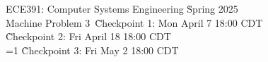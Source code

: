 \documentclass{article}
\begin{document}
\topmargin=-30pt
\headheight=12pt
\headsep=18pt
\footskip=0pt
\pagestyle{headings}
\thispagestyle{empty}

\newcommand{\showallduedates}{0}

\newlength{\sus}
\newlength{\extrasus}

{\large \bf
    \begin{tabbing}
    ECE391: Computer Systems Engineering \` Spring 2025\\
    Machine Problem 3\
    \` Checkpoint 1: Mon April \hphantom{1}7 18:00 CDT \\
	\` Checkpoint 2: \hspace{\extrasus}Fri April 18 18:00 CDT \\
    \ifnum\showallduedates=1
	\` Checkpoint 3: Fri May\hspace{\sus} \hphantom{1}2 18:00 CDT
    \else
    \fi
    \end{tabbing}
}




\end{document}
